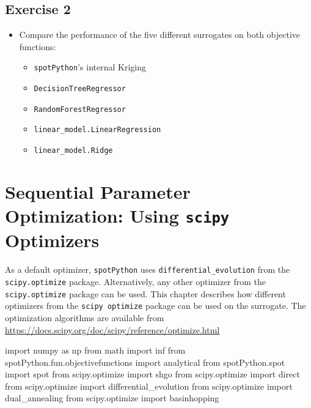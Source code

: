 \documentclass[
  letterpaper,
  DIV=11,
  numbers=noendperiod]{scrreprt}
\newenvironment{Shaded}{\begin{snugshade}}{\end{snugshade}}
\newcommand{\ImportTok}[1]{\textcolor[rgb]{0.00,0.46,0.62}{#1}}
\newcommand{\NormalTok}[1]{\textcolor[rgb]{0.00,0.23,0.31}{#1}}
\providecommand{\tightlist}{%
  \setlength{\itemsep}{0pt}\setlength{\parskip}{0pt}}\usepackage{longtable,booktabs,array}
\begin{document}
\hypertarget{exercise-2}{%
\section{Exercise 2}\label{exercise-2}}

\begin{itemize}
\item
  Compare the performance of the five different surrogates on both
  objective functions:

  \begin{itemize}
  \tightlist
  \item
    \texttt{spotPython}'s internal Kriging
  \item
    \texttt{DecisionTreeRegressor}
  \item
    \texttt{RandomForestRegressor}
  \item
    \texttt{linear\_model.LinearRegression}
  \item
    \texttt{linear\_model.Ridge}
  \end{itemize}
\end{itemize}

\hypertarget{sec-scipy-optimizers}{%
\chapter{\texorpdfstring{Sequential Parameter Optimization: Using
\texttt{scipy}
Optimizers}{Sequential Parameter Optimization: Using scipy Optimizers}}\label{sec-scipy-optimizers}}

As a default optimizer, \texttt{spotPython} uses
\texttt{differential\_evolution} from the \texttt{scipy.optimize}
package. Alternatively, any other optimizer from the
\texttt{scipy.optimize} package can be used. This chapter describes how
different optimizers from the \texttt{scipy\ optimize} package can be
used on the surrogate. The optimization algorithms are available from
\url{https://docs.scipy.org/doc/scipy/reference/optimize.html}

\begin{Shaded}
\begin{Highlighting}[]
\ImportTok{import}\NormalTok{ numpy }\ImportTok{as}\NormalTok{ np}
\ImportTok{from}\NormalTok{ math }\ImportTok{import}\NormalTok{ inf}
\ImportTok{from}\NormalTok{ spotPython.fun.objectivefunctions }\ImportTok{import}\NormalTok{ analytical}
\ImportTok{from}\NormalTok{ spotPython.spot }\ImportTok{import}\NormalTok{ spot}
\ImportTok{from}\NormalTok{ scipy.optimize }\ImportTok{import}\NormalTok{ shgo}
\ImportTok{from}\NormalTok{ scipy.optimize }\ImportTok{import}\NormalTok{ direct}
\ImportTok{from}\NormalTok{ scipy.optimize }\ImportTok{import}\NormalTok{ differential\_evolution}
\ImportTok{from}\NormalTok{ scipy.optimize }\ImportTok{import}\NormalTok{ dual\_annealing}
\ImportTok{from}\NormalTok{ scipy.optimize }\ImportTok{import}\NormalTok{ basinhopping}
\end{Highlighting}
\end{Shaded}
\end{document}
